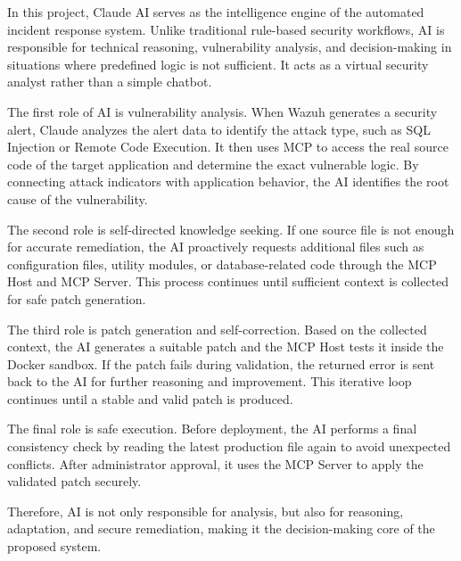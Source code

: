 \documentclass[12pt]{report}
\begin{document}
In this project, Claude AI serves as the intelligence engine of the automated incident response system. Unlike traditional rule-based security workflows, AI is responsible for technical reasoning, vulnerability analysis, and decision-making in situations where predefined logic is not sufficient. It acts as a virtual security analyst rather than a simple chatbot.

The first role of AI is vulnerability analysis. When Wazuh generates a security alert, Claude analyzes the alert data to identify the attack type, such as SQL Injection or Remote Code Execution. It then uses MCP to access the real source code of the target application and determine the exact vulnerable logic. By connecting attack indicators with application behavior, the AI identifies the root cause of the vulnerability.

The second role is self-directed knowledge seeking. If one source file is not enough for accurate remediation, the AI proactively requests additional files such as configuration files, utility modules, or database-related code through the MCP Host and MCP Server. This process continues until sufficient context is collected for safe patch generation.

The third role is patch generation and self-correction. Based on the collected context, the AI generates a suitable patch and the MCP Host tests it inside the Docker sandbox. If the patch fails during validation, the returned error is sent back to the AI for further reasoning and improvement. This iterative loop continues until a stable and valid patch is produced.

The final role is safe execution. Before deployment, the AI performs a final consistency check by reading the latest production file again to avoid unexpected conflicts. After administrator approval, it uses the MCP Server to apply the validated patch securely.

Therefore, AI is not only responsible for analysis, but also for reasoning, adaptation, and secure remediation, making it the decision-making core of the proposed system.
\end{document}
